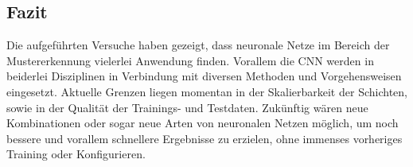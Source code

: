 \subsection{Fazit}
Die aufgeführten Versuche haben gezeigt, dass neuronale Netze im Bereich der Mustererkennung vielerlei Anwendung finden. Vorallem die CNN werden in beiderlei Disziplinen in Verbindung mit diversen Methoden und Vorgehensweisen eingesetzt. Aktuelle Grenzen liegen momentan in der Skalierbarkeit der Schichten, sowie in der Qualität der Trainings- und Testdaten. Zukünftig wären neue Kombinationen oder sogar neue Arten von neuronalen Netzen möglich, um noch bessere und vorallem schnellere Ergebnisse zu erzielen, ohne immenses vorheriges Training oder Konfigurieren. 